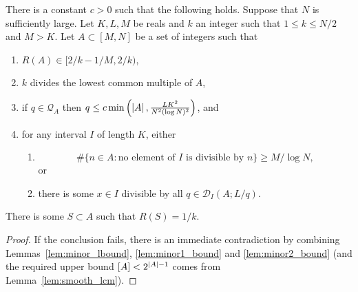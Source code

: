 \begin{proposition}\label{prop:fourier}
There is a constant $c>0$ such that the following holds. Suppose that $N$ is sufficiently large. Let $K,L,M$ be reals and $k$ an integer such that $1\leq k\leq N/2$ and $M>K$. Let $A\subset [M,N]$ be a set of integers such that
\begin{enumerate}
\item $R(A)\in [2/k-1/M,2/k)$,
\item $k$ divides the lowest common multiple of $A$,
\item if $q\in\mathcal{Q}_A$ then $q\leq c\min\left( \left\lvert A\right\rvert,\frac{LK^2}{N^2(\log N)^2}\right)$,  and
\item for any interval $I$ of length $K$, either
\begin{enumerate}
\item \[\# \{ n\in A : \textrm{no element of }I\textrm{ is divisible by }n\}\geq M/\log N,\]
or
\item there is some $x\in I$ divisible by all $q\in\mathcal{D}_I(A; L/q)$.
\end{enumerate}
\end{enumerate}
There is some $S\subset A$ such that $R(S)=1/k$.
\end{proposition}
\begin{proof}
If the conclusion fails, there is an immediate contradiction by combining Lemmas~\ref{lem:minor_lbound}, \ref{lem:minor1_bound} and \ref{lem:minor2_bound} (and the required upper bound $[A]<2^{\left\lvert A\right\rvert-1}$ comes from Lemma~\ref{lem:smooth_lcm}).
\end{proof}

